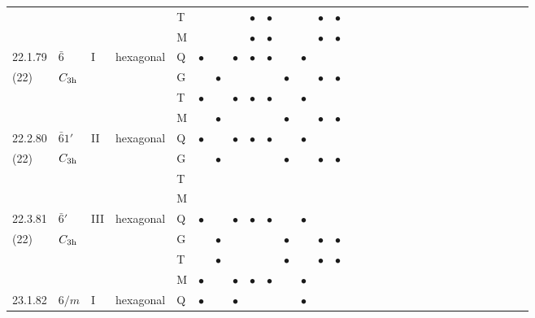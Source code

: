 \documentclass[fleqn,9pt,landscape]{jsarticle}
\begin{document}
\begin{longtable}{lllll|l|l|l|l|l|l|l|l|l|ll|ll|ll|ll|ll|ll|ll|ll}
 &  &  &  & T &  &  &  & $\bullet$ & $\bullet$ &  &  & $\bullet$ & $\bullet$ &  &  &  &  &  &  &  &  &  &  &  &  &  &  &  &  \\
 &  &  &  & M &  &  &  & $\bullet$ & $\bullet$ &  &  & $\bullet$ & $\bullet$ &  &  &  &  &  &  &  &  &  &  &  &  &  &  &  &  \\ \hline
22.1.79 & \texttt{$\bar{6}$} & I & hexagonal & Q & $\bullet$ &  & $\bullet$ & $\bullet$ & $\bullet$ &  & $\bullet$ &  &  &  &  &  &  &  &  &  &  &  &  &  &  &  &  &  &  \\
(22) & $C_{\rm 3h}$ &  &  & G &  & $\bullet$ &  &  &  & $\bullet$ &  & $\bullet$ & $\bullet$ &  &  &  &  &  &  &  &  &  &  &  &  &  &  &  &  \\
 &  &  &  & T & $\bullet$ &  & $\bullet$ & $\bullet$ & $\bullet$ &  & $\bullet$ &  &  &  &  &  &  &  &  &  &  &  &  &  &  &  &  &  &  \\
 &  &  &  & M &  & $\bullet$ &  &  &  & $\bullet$ &  & $\bullet$ & $\bullet$ &  &  &  &  &  &  &  &  &  &  &  &  &  &  &  &  \\ \hline
22.2.80 & \texttt{$\bar{6}1'$} & II & hexagonal & Q & $\bullet$ &  & $\bullet$ & $\bullet$ & $\bullet$ &  & $\bullet$ &  &  &  &  &  &  &  &  &  &  &  &  &  &  &  &  &  &  \\
(22) & $C_{\rm 3h}$ &  &  & G &  & $\bullet$ &  &  &  & $\bullet$ &  & $\bullet$ & $\bullet$ &  &  &  &  &  &  &  &  &  &  &  &  &  &  &  &  \\
 &  &  &  & T &  &  &  &  &  &  &  &  &  &  &  &  &  &  &  &  &  &  &  &  &  &  &  &  &  \\
 &  &  &  & M &  &  &  &  &  &  &  &  &  &  &  &  &  &  &  &  &  &  &  &  &  &  &  &  &  \\ \hline
22.3.81 & \texttt{$\bar{6}'$} & III & hexagonal & Q & $\bullet$ &  & $\bullet$ & $\bullet$ & $\bullet$ &  & $\bullet$ &  &  &  &  &  &  &  &  &  &  &  &  &  &  &  &  &  &  \\
(22) & $C_{\rm 3h}$ &  &  & G &  & $\bullet$ &  &  &  & $\bullet$ &  & $\bullet$ & $\bullet$ &  &  &  &  &  &  &  &  &  &  &  &  &  &  &  &  \\
 &  &  &  & T &  & $\bullet$ &  &  &  & $\bullet$ &  & $\bullet$ & $\bullet$ &  &  &  &  &  &  &  &  &  &  &  &  &  &  &  &  \\
 &  &  &  & M & $\bullet$ &  & $\bullet$ & $\bullet$ & $\bullet$ &  & $\bullet$ &  &  &  &  &  &  &  &  &  &  &  &  &  &  &  &  &  &  \\ \hline
23.1.82 & \texttt{$6/m$} & I & hexagonal & Q & $\bullet$ &  & $\bullet$ &  &  &  & $\bullet$ &  &  &  &  &  &  &  &  &  &  &  &  &  &  &  &  &  &  \\

\end{longtable}
\end{document}
